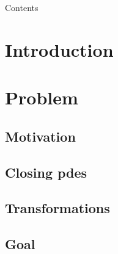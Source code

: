 \documentclass[10pt]{beamer}
\title[University of Wisconsin Milwaukee]{\mytitle}
\author[\myauthor]{\myauthor}
\institute[]{University of Wisconsin Milwaukee}
\date[\textcolor{white}{05/03/2024}]{05/03/2024}
\begin{document}
    \frame{\titlepage}

    \begin{frame}{Contents}
        \tableofcontents
    \end{frame}


    \section{Introduction}\label{sec:introduction}
    \begin{frame}{}

    \end{frame}


    \section{Problem}\label{sec:problem}

    \begin{frame}{}

    \end{frame}

    \subsection{Motivation}\label{subsec:motivation}

    \begin{frame}{}

    \end{frame}

    \subsection{Closing pdes}\label{subsec:closing-pdes}

    \begin{frame}{}

    \end{frame}

    \subsection{Transformations}\label{subsec:transformations}

    \begin{frame}{}

    \end{frame}

    \subsection{Goal}\label{subsec:goal}
\end{document}
